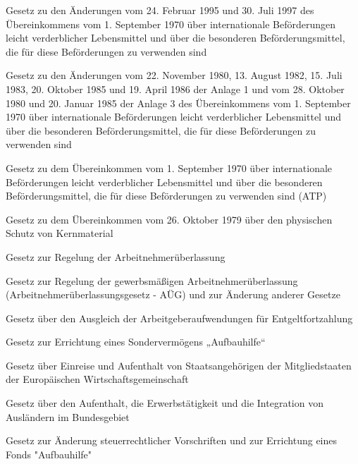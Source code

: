 \item[{ATPÄndG-2}] Gesetz zu den Änderungen vom 24. Februar 1995 und 30. Juli 1997 des Übereinkommens vom 1. September 1970 über internationale Beförderungen leicht verderblicher Lebensmittel und über die besonderen Beförderungsmittel, die für diese Beförderungen zu verwenden sind

\item[{ATPAnl1-3ÄndG}] Gesetz zu den Änderungen vom 22. November 1980, 13. August 1982, 15. Juli 1983, 20. Oktober 1985 und 19. April 1986 der Anlage 1 und vom 28. Oktober 1980 und 20. Januar 1985 der Anlage 3 des Übereinkommens vom 1. September 1970 über internationale Beförderungen leicht verderblicher Lebensmittel und über die besonderen Beförderungsmittel, die für diese Beförderungen zu verwenden sind

\item[{ATPG}] Gesetz zu dem Übereinkommen vom 1. September 1970 über internationale Beförderungen leicht verderblicher Lebensmittel und über die besonderen Beförderungsmittel, die für diese Beförderungen zu verwenden sind (ATP)

\item[{AtSchÜbkG}] Gesetz zu dem Übereinkommen vom 26. Oktober 1979 über den physischen Schutz von Kernmaterial

\item[{AÜG}] Gesetz zur Regelung der Arbeitnehmerüberlassung

\item[{AÜGuaÄndG}] Gesetz zur Regelung der gewerbsmäßigen Arbeitnehmerüberlassung (Arbeitnehmerüberlassungsgesetz - AÜG) und zur Änderung anderer Gesetze

\item[{AufAG}] Gesetz über den Ausgleich der Arbeitgeberaufwendungen für Entgeltfortzahlung

\item[{AufbhG}] Gesetz zur Errichtung eines Sondervermögens „Aufbauhilfe“

\item[{AufenthEWGG}] Gesetz über Einreise und Aufenthalt von Staatsangehörigen der Mitgliedstaaten der Europäischen Wirtschaftsgemeinschaft

\item[{AufenthG-2004}] Gesetz über den Aufenthalt, die Erwerbstätigkeit und die Integration von Ausländern im Bundesgebiet

\item[{AufhFErG}] Gesetz zur Änderung steuerrechtlicher Vorschriften und zur Errichtung eines Fonds "Aufbauhilfe"

